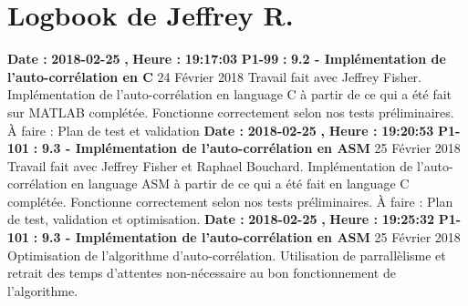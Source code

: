 \documentclass{article}%
\begin{document}
%
\section{Logbook de Jeffrey R.}%
\textbf{Date : }%
\textbf{2018{-}02{-}25}%
\textbf{,}%
\textbf{ Heure : }%
\textbf{19:17:03}%
\newline%
%
\textbf{P1{-}99 }%
\textbf{ : }%
\textbf{ 9.2 {-} Implémentation de l'auto{-}corrélation en C}%
\newline%
\newline%
%
24 Février 2018\newline%
Travail fait avec Jeffrey Fisher.\newline%
Implémentation de l'auto{-}corrélation en language C à partir de ce qui a été fait sur MATLAB complétée.\newline%
Fonctionne correctement selon nos tests préliminaires.\newline%
À faire : Plan de test et validation\newline%
\newline%
%
\textbf{Date : }%
\textbf{2018{-}02{-}25}%
\textbf{,}%
\textbf{ Heure : }%
\textbf{19:20:53}%
\newline%
%
\textbf{P1{-}101 }%
\textbf{ : }%
\textbf{ 9.3 {-} Implémentation de l'auto{-}corrélation en ASM}%
\newline%
\newline%
%
25 Février 2018\newline%
Travail fait avec Jeffrey Fisher et Raphael Bouchard.\newline%
Implémentation de l'auto{-}corrélation en language ASM à partir de ce qui a été fait en language C complétée.\newline%
Fonctionne correctement selon nos tests préliminaires.\newline%
À faire : Plan de test, validation et optimisation.\newline%
\newline%
%
\textbf{Date : }%
\textbf{2018{-}02{-}25}%
\textbf{,}%
\textbf{ Heure : }%
\textbf{19:25:32}%
\newline%
%
\textbf{P1{-}101 }%
\textbf{ : }%
\textbf{ 9.3 {-} Implémentation de l'auto{-}corrélation en ASM}%
\newline%
\newline%
%
25 Février 2018\newline%
Optimisation de l'algorithme d'auto{-}corrélation. Utilisation de parrallèlisme et retrait des temps d'attentes non{-}nécessaire au bon fonctionnement de l'algorithme.\newline%
\end{document}
